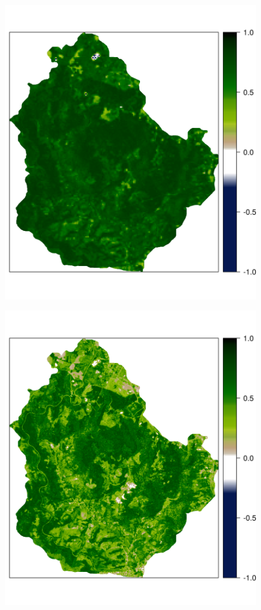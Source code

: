 \begin{figure}[!ht]
\centering
\begin{minipage}[b]{0.45\textwidth}
\subcaption{}
\label{fig:chap05-sat-old}
\centering
\includegraphics[width = \textwidth]{fig/chap05-sat-old}
\end{minipage}
\begin{minipage}[b]{0.45\textwidth}
\subcaption{}
\label{fig:chap05-sat-new}
\centering
\includegraphics[width = \textwidth]{fig/chap05-sat-new}

\end{minipage}
\end{figure}
